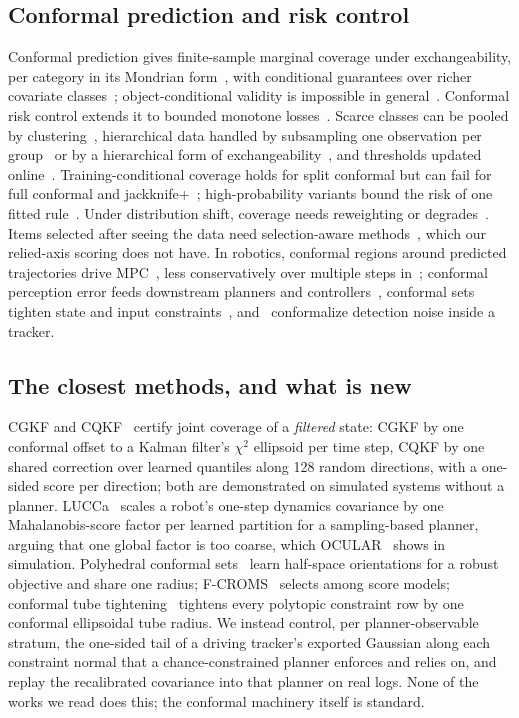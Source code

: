 \documentclass{ieeeaccess}
\begin{document}
\subsection{Conformal prediction and risk control}
Conformal prediction gives finite-sample marginal coverage under exchangeability, per category in its Mondrian form~\cite{Vovk2012,Bostrom2020}, with conditional guarantees over richer covariate classes~\cite{Gibbs2025}; object-conditional validity is impossible in general~\cite{Vovk2012,Lei2014,Barber2021}. Conformal risk control extends it to bounded monotone losses~\cite{Angelopoulos2024,Bates2021}. Scarce classes can be pooled by clustering~\cite{Ding2023}, hierarchical data handled by subsampling one observation per group~\cite{Dunn2023} or by a hierarchical form of exchangeability~\cite{LeeBarberWillett2026}, and thresholds updated online~\cite{GibbsCandes2021}. Training-conditional coverage holds for split conformal but can fail for full conformal and jackknife+~\cite{BianBarber2023}; high-probability variants bound the risk of one fitted rule~\cite{Bates2021,Angelopoulos2025LTT}. Under distribution shift, coverage needs reweighting or degrades~\cite{Tibshirani2019,Barber2023}. Items selected after seeing the data need selection-aware methods~\cite{JinCandes2023,Bao2024}, which our relied-axis scoring does not have. In robotics, conformal regions around predicted trajectories drive MPC~\cite{Lindemann2023,Dixit2023,Lindemann2025}, less conservatively over multiple steps in~\cite{Cleaveland2024}; conformal perception error feeds downstream planners and controllers~\cite{Yang2023,Zhang2025,DixitMei2024}, conformal sets tighten state and input constraints~\cite{Natraj2026,Vlahakis2024}, and~\cite{Su2024} conformalize detection noise inside a tracker.

\subsection{The closest methods, and what is new}
CGKF and CQKF~\cite{Weisman2026} certify joint coverage of a \emph{filtered} state: CGKF by one conformal offset to a Kalman filter's $\chi^{2}$ ellipsoid per time step, CQKF by one shared correction over learned quantiles along 128 random directions, with a one-sided score per direction; both are demonstrated on simulated systems without a planner. LUCCa~\cite{Marques2026a} scales a robot's one-step dynamics covariance by one Mahalanobis-score factor per learned partition for a sampling-based planner, arguing that one global factor is too coarse, which OCULAR~\cite{Marques2026b} shows in simulation. Polyhedral conformal sets~\cite{Chen2026} learn half-space orientations for a robust objective and share one radius; F-CROMS~\cite{Bao2026} selects among score models; conformal tube tightening~\cite{DSilva2026} tightens every polytopic constraint row by one conformal ellipsoidal tube radius. We instead control, per planner-observable stratum, the one-sided tail of a driving tracker's exported Gaussian along each constraint normal that a chance-constrained planner enforces and relies on, and replay the recalibrated covariance into that planner on real logs. None of the works we read does this; the conformal machinery itself is standard.
\end{document}
